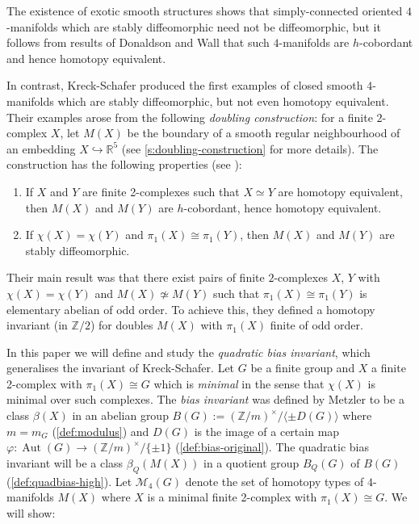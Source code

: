\documentclass[11pt,a4paper,leqno]{amsart}
\theoremstyle{definition}
\theoremstyle{remark}
\newcommand{\cy}[1]{\Z/{#1}}
\newcommand{\R}{\mathbb{R}}
\newcommand{\Z}{\mathbb{Z}}
\DeclareMathOperator{\Aut}{Aut}
\newcommand{\sM}{\mathscr{M}}
\begin{document}
The existence of exotic smooth structures shows that simply-connected oriented $4$-manifolds which are stably diffeomorphic need not be diffeomorphic, 
but it follows from results of Donaldson \cite{Donaldson:1983a} and Wall  \cite{Wall:1964} that 
such $4$-manifolds are $h$-cobordant and hence homotopy equivalent. 

In contrast, Kreck-Schafer \cite{Kreck:1984} produced the first examples of closed smooth $4$-manifolds which are stably diffeomorphic, but not even homotopy equivalent. 
Their examples arose from the following  \emph{doubling construction}: for a finite $2$-complex $X$, let $M(X)$ be the boundary of a smooth regular neighbourhood of an embedding $X \hookrightarrow \R^5$ (see \cref{s:doubling-construction} for more details). 
The construction has the following properties (see \cite[Section 2]{Kreck:1984}): 
\begin{enumerate}
\item If $X$ and $Y$ are finite 2-complexes such that $X \simeq Y$ are homotopy equivalent, then $M(X)$ and $M(Y)$ are $h$-cobordant, hence homotopy equivalent.
\item If $\chi(X) = \chi(Y)$ and $\pi_1(X) \cong \pi_1(Y)$, then $M(X)$ and $M(Y)$ are stably diffeomorphic.
\end{enumerate}
Their main result was that there exist pairs of finite $2$-complexes $X$, $Y$ with $\chi(X) = \chi(Y)$ and $M(X) \not\simeq M(Y)$ such that $\pi_1(X) \cong \pi_1(Y)$ is elementary abelian of odd order. 
To achieve this, they defined a homotopy invariant (in $\cy 2$) for doubles $M(X)$ with $\pi_1(X)$  finite of odd order.

\smallskip
In this paper we will define and study the \textit{quadratic bias invariant}, which generalises the invariant of Kreck-Schafer.
Let $G$ be a finite group and $X$ a finite 2-complex with $\pi_1(X) \cong G$ which is \textit{minimal} in the sense that $\chi(X)$ is minimal over such complexes.
The \textit{bias invariant} was defined by Metzler \cite{Metzler:1976} to be a class $\beta(X)$ in an abelian group $B(G) := (\Z/m)^\times/\langle \pm D(G) \rangle$ where $m = m_G$ (\cref{def:modulus}) and $D(G)$ is the image of a certain map $\varphi\colon\Aut(G) \to (\Z/m)^\times/\{\pm 1\}$ (\cref{def:bias-original}).
The quadratic bias invariant will be a class $\beta_Q(M(X))$ in a quotient group $B_Q(G)$ of $B(G)$ 
(\cref{def:quadbias-high}).
Let $\sM_4(G)$ denote the set of homotopy types of $4$-manifolds $M(X)$ where $X$ is a minimal finite 2-complex with $\pi_1(X) \cong G$. We will show:
\end{document}
